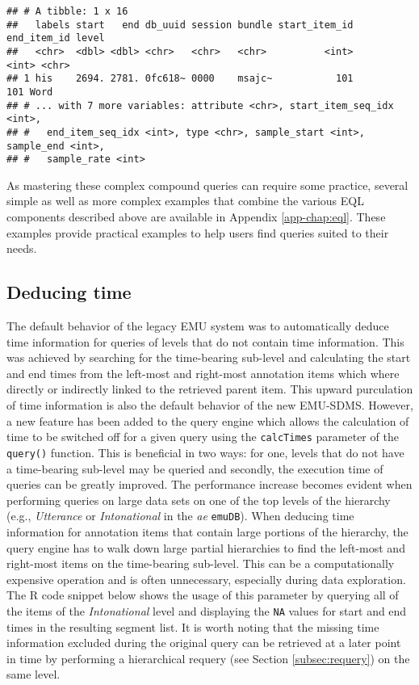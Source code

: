 \documentclass[
]{book}
\begin{document}
\begin{verbatim}
## # A tibble: 1 x 16
##   labels start   end db_uuid session bundle start_item_id end_item_id level
##   <chr>  <dbl> <dbl> <chr>   <chr>   <chr>          <int>       <int> <chr>
## 1 his    2694. 2781. 0fc618~ 0000    msajc~           101         101 Word 
## # ... with 7 more variables: attribute <chr>, start_item_seq_idx <int>,
## #   end_item_seq_idx <int>, type <chr>, sample_start <int>, sample_end <int>,
## #   sample_rate <int>
\end{verbatim}

As mastering these complex compound queries can require some practice, several simple as well as more complex examples that combine the various EQL components described above are available in Appendix \ref{app-chap:eql}. These examples provide practical examples to help users find queries suited to their needs.

\hypertarget{subsec:query-deducingTime}{%
\subsection{Deducing time}\label{subsec:query-deducingTime}}

The default behavior of the legacy EMU system was to automatically deduce time information for queries of levels that do not contain time information. This was achieved by searching for the time-bearing sub-level and calculating the start and end times from the left-most and right-most annotation items which where directly or indirectly linked to the retrieved parent item. This upward purculation of time information is also the default behavior of the new EMU-SDMS. However, a new feature has been added to the query engine which allows the calculation of time to be switched off for a given query using the \texttt{calcTimes} parameter of the \texttt{query()} function. This is beneficial in two ways: for one, levels that do not have a time-bearing sub-level may be queried and secondly, the execution time of queries can be greatly improved. The performance increase becomes evident when performing queries on large data sets on one of the top levels of the hierarchy (e.g., \emph{Utterance} or \emph{Intonational} in the \emph{ae} \texttt{emuDB}). When deducing time information for annotation items that contain large portions of the hierarchy, the query engine has to walk down large partial hierarchies to find the left-most and right-most items on the time-bearing sub-level. This can be a computationally expensive operation and is often unnecessary, especially during data exploration. The R code snippet below shows the usage of this parameter by querying all of the items of the \emph{Intonational} level and displaying the \texttt{NA} values for start and end times in the resulting segment list. It is worth noting that the missing time information excluded during the original query can be retrieved at a later point in time by performing a hierarchical requery (see Section \ref{subsec:requery}) on the same level.
\end{document}
